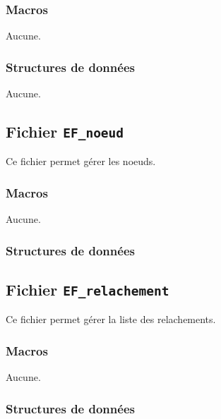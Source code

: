 \documentclass{article}
\begin{document}
\subsubsection{Macros}
Aucune.
\subsubsection{Structures de données}
Aucune.












\subsection{Fichier {\texttt{EF\_noeud}}}
Ce fichier permet gérer les noeuds.
\subsubsection{Macros}
Aucune.
\subsubsection{Structures de données}









\subsection{Fichier {\texttt{EF\_relachement}}}
Ce fichier permet gérer la liste des relachements.
\subsubsection{Macros}
Aucune.
\subsubsection{Structures de données}









\end{document}
